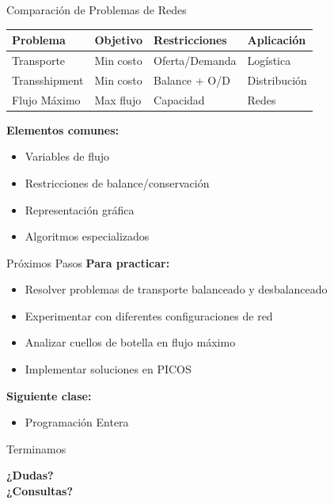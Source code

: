 \documentclass{beamer}
\begin{document}
\begin{frame}{Comparación de Problemas de Redes}
    \begin{table}[H]
        \centering
        \begin{tabular}{l|l|l|l}
            \toprule
            \textbf{Problema} & \textbf{Objetivo} & \textbf{Restricciones} & \textbf{Aplicación} \\
            \midrule
            Transporte & Min costo & Oferta/Demanda & Logística \\
            Transshipment & Min costo & Balance + O/D & Distribución \\
            Flujo Máximo & Max flujo & Capacidad & Redes \\
            \bottomrule
        \end{tabular}
    \end{table}
    
    \vspace{1em}
    \textbf{Elementos comunes:}
    \begin{itemize}
        \item Variables de flujo
        \item Restricciones de balance/conservación
        \item Representación gráfica
        \item Algoritmos especializados
    \end{itemize}
\end{frame}

\begin{frame}{Próximos Pasos}
    \textbf{Para practicar:}
    \begin{itemize}
        \item Resolver problemas de transporte balanceado y desbalanceado
        \item Experimentar con diferentes configuraciones de red
        \item Analizar cuellos de botella en flujo máximo
        \item Implementar soluciones en PICOS
    \end{itemize}
    
    \vspace{1em}
    \textbf{Siguiente clase:}
    \begin{itemize}
        \item Programación Entera
    \end{itemize}
\end{frame}

\begin{frame}{Terminamos}
    \begin{center}
        \Large{\textbf{¿Dudas?\\¿Consultas?}}
    \end{center}
\end{frame}
\end{document}
